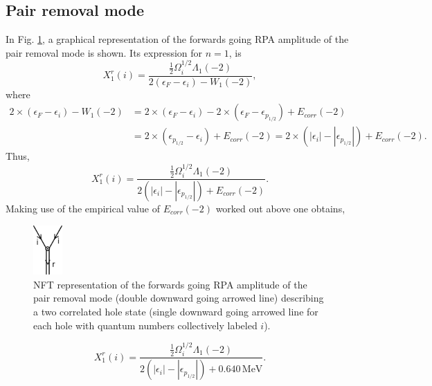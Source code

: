\subsection{Pair removal mode}\label{S3.5.1}
In Fig. \ref{fig1E2}, a graphical representation of the forwards going RPA amplitude of the pair removal mode is shown. Its expression for $n=1$, is 
\begin{equation*}
X_1^r(i)=\frac{\frac{1}{2}\Omega_i^{1/2}\Lambda_1(-2)}{2(\epsilon_F-\epsilon_i)-W_1(-2)},
\end{equation*}
where
\begin{equation*}
\begin{split}
2\times(\epsilon_F-\epsilon_i)-W_1(-2)&=2\times(\epsilon_F-\epsilon_i)-2\times(\epsilon_F-\epsilon_{p_{1/2}})+E_{corr}(-2)\\
&=2\times(\epsilon_{p_{1/2}}-\epsilon_i)+E_{corr}(-2)=2\times(|\epsilon_i|-|\epsilon_{p_{1/2}}|)+E_{corr}(-2).
\end{split}
\end{equation*}
Thus,
\begin{equation*}
X_1^r(i)=\frac{\frac{1}{2}\Omega_i^{1/2}\Lambda_1(-2)}{2(|\epsilon_i|-|\epsilon_{p_{1/2}}|)+E_{corr}(-2)}.
\end{equation*}
Making use of the empirical value of $E_{corr}(-2)$ worked out above one obtains, 
  \begin{figure}
  \centerline{\includegraphics*[width=0.1\textwidth,angle=0]{nutshell/figs/removal_forward.pdf}}
  \caption[NFT representation of the forwards going RPA amplitude of the pair removal mode  describing a two correlated hole state.]{NFT representation of the forwards going RPA amplitude of the pair removal mode (double downward going arrowed line) describing a two correlated hole state (single downward going arrowed line for each hole with quantum numbers collectively labeled $i$).}\label{fig1E2}
  \end{figure}
\begin{equation}\label{eq3.5.4}
X_1^r(i)=\frac{\frac{1}{2}\Omega_i^{1/2}\Lambda_1(-2)}{2(|\epsilon_i|-|\epsilon_{p_{1/2}}|)+0.640\,\text{MeV}}.
\end{equation}

